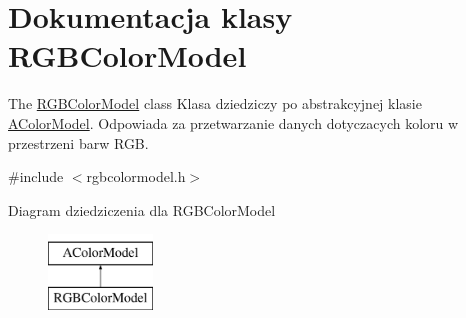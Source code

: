 \hypertarget{class_r_g_b_color_model}{}\section{Dokumentacja klasy R\+G\+B\+Color\+Model}
\label{class_r_g_b_color_model}


The \mbox{\hyperlink{class_r_g_b_color_model}{R\+G\+B\+Color\+Model}} class Klasa dziedziczy po abstrakcyjnej klasie \mbox{\hyperlink{class_a_color_model}{A\+Color\+Model}}. Odpowiada za przetwarzanie danych dotyczacych koloru w przestrzeni barw R\+GB.  




{\ttfamily \#include $<$rgbcolormodel.\+h$>$}

Diagram dziedziczenia dla R\+G\+B\+Color\+Model\begin{figure}[H]
\begin{center}
\leavevmode
\includegraphics[height=2.000000cm]{class_r_g_b_color_model}
\end{center}
\end{figure}
